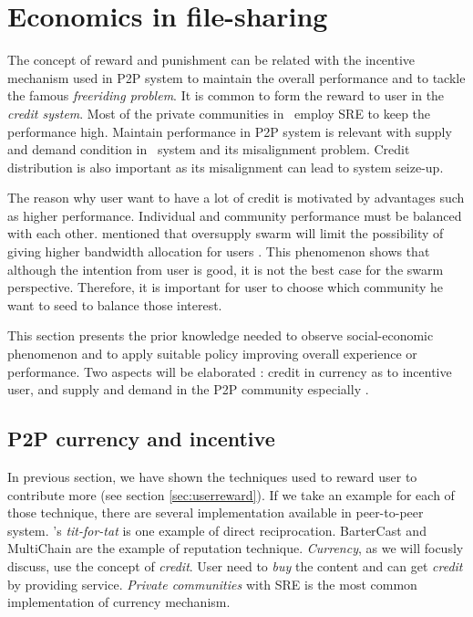\section{Economics in file-sharing}
The concept of reward and punishment can be related with the incentive mechanism used in P2P system to maintain the overall performance and to tackle the famous \textit{freeriding problem}. It is common to form the reward to user in the \textit{credit system}. Most of the private communities in \bt~employ SRE to keep the performance high. Maintain performance in P2P system is relevant with supply and demand condition in \bt~system and its misalignment problem. Credit distribution is also important as its misalignment can lead to system seize-up.

The reason why user want to have a lot of credit is motivated by advantages such as higher performance. Individual and community performance must be balanced with each other. \citeauthor{2013:survivepriv:jia} mentioned that oversupply swarm will limit the possibility of giving higher bandwidth allocation for users \cite{2013:survivepriv:jia}. This phenomenon shows that although the intention from user is good, it is not the best case for the swarm perspective. Therefore, it is important for user to choose which community he want to seed to balance those interest.

This section presents the prior knowledge needed to observe social-economic phenomenon and to apply suitable policy improving overall experience or performance. Two aspects will be elaborated : credit in currency as to incentive user, and supply and demand in the P2P community especially \bt.

\subsection{P2P currency and incentive}
In previous section, we have shown the techniques used to reward user to contribute more (see section \ref{sec:userreward}). If we take an example for each of those technique, there are several implementation available in peer-to-peer system. \bt's \textit{tit-for-tat} is one example of direct reciprocation. BarterCast \cite{2009:bartercast:meulpolder} and MultiChain \cite{2015:multichain:norberhuis} are the example of reputation technique. \textit{Currency}, as we will focusly discuss, use the concept of \textit{credit}. User need to \textit{buy} the content and can get \textit{credit} by providing service. \textit{Private communities} with SRE is the most common implementation of currency mechanism.

